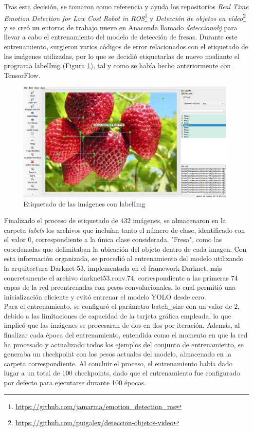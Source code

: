 Tras esta decisión, se tomaron como referencia y ayuda los repositorios \textit{Real Time Emotion Detection for Low Cost Robot in ROS}\footnote{\url{https://github.com/jamarma/emotion_detection_ros}} y \textit{Detección de objetos en vídeo}\footnote{\url{https://github.com/puigalex/deteccion-objetos-video}} y se creó un entorno de trabajo nuevo en Anaconda llamado \textit{deteccionobj} para llevar a cabo el entrenamiento del modelo de detección de fresas. Durante este entrenamiento, surgieron varios códigos de error relacionados con el etiquetado de las imágenes utilizadas, por lo que se decidió etiquetarlas de nuevo mediante el programa labelImg (Figura \ref{fig:labelImg_Fresas}), tal y como se había hecho anteriormente con TensorFlow.

 \begin{figure}[H]
     \centering
     \begin{center}
       \includegraphics[width=11cm]{figs/labelImg Fresa.png}
     \end{center}
     \caption{Etiquetado de las imágenes con labelImg}
    \label{fig:labelImg_Fresas}
  \end{figure}

Finalizado el proceso de etiquetado de 432 imágenes, se almacenaron en la carpeta \textit{labels} los archivos que incluían tanto el número de clase, identificado con el valor 0, correspondiente a la única clase considerada, "Fresa",  como las coordenadas que delimitaban la ubicación del objeto dentro de cada imagen. Con esta información organizada, se procedió al entrenamiento del modelo utilizando la arquitectura Darknet-53, implementada en el framework Darknet, más concretamente el archivo darknet53.conv.74, correspondiente a las primeras 74 capas de la red preentrenadas con pesos convolucionales, lo cual permitió una inicialización eficiente y evitó entrenar el modelo YOLO desde cero.\\

Para el entrenamiento, se configuró el parámetro batch\_size con un valor de 2, debido a las limitaciones de capacidad de la tarjeta gráfica empleada, lo que implicó que las imágenes se procesaran de dos en dos por iteración. Además, al finalizar cada época del entrenamiento, entendida como el momento en que la red ha procesado y actualizado todos los ejemplos del conjunto de entrenamiento, se generaba un checkpoint con los pesos actuales del modelo, almacenado en la carpeta correspondiente. Al concluir el proceso, el entrenamiento había dado lugar a un total de 100 checkpoints, dado que el entrenamiento fue configurado por defecto para ejecutarse durante 100 épocas.

